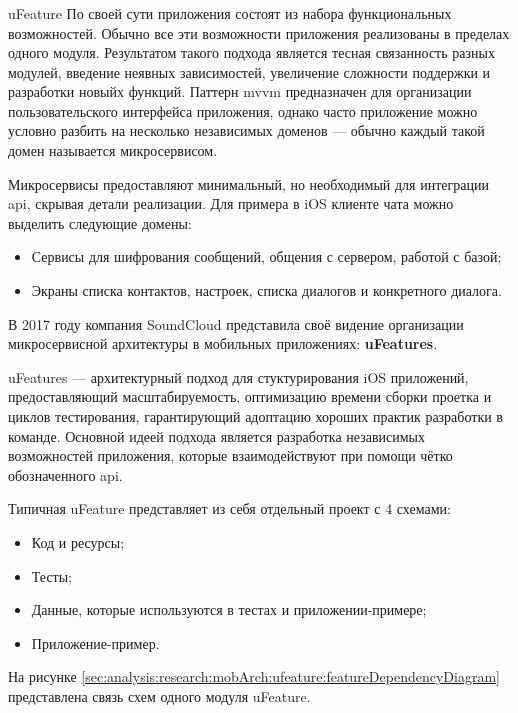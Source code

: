\subsubsection{} uFeature
По своей сути приложения состоят из набора функциональных возможностей. Обычно все эти возможности приложения реализованы в пределах одного модуля. Результатом такого подхода является тесная связанность разных модулей, введение неявных зависимостей, увеличение сложности поддержки и разработки новыйх функций. Паттерн \gls{mvvm} предназначен для организации пользовательского интерфейса приложения, однако часто приложение можно условно разбить на несколько независимых доменов --- обычно каждый такой домен называется микросервисом.

Микросервисы предоставляют минимальный, но необходимый для интеграции \gls{api}, скрывая детали реализации. Для примера в iOS клиенте чата можно выделить следующие домены:

\begin{itemize}
	\item Сервисы для шифрования сообщений, общения с сервером, работой с базой;
	\item Экраны списка контактов, настроек, списка диалогов и конкретного диалога.
\end{itemize}

В 2017 году компания SoundCloud представила своё видение организации микросервисной архитектуры в мобильных приложениях: \textbf{uFeatures}.

uFeatures --- архитектурный подход для стуктурирования iOS приложений, предоставляющий масштабируемость, оптимизацию времени сборки проетка и циклов тестирования, гарантирующий адоптацию хороших практик разработки в команде. Основной идеей подхода является разработка независимых возможностей приложения, которые взаимодействуют при помощи чётко обозначенного \gls{api}. \cite{soundcloud:ufeature}

Типичная uFeature представляет из себя отдельный проект с 4 схемами:

\begin{itemize}
	\item Код и ресурсы;
	\item Тесты;
	\item Данные, которые используются в тестах и приложении-примере;
	\item Приложение-пример.
\end{itemize}

На рисунке \ref{sec:analysis:research:mobArch:ufeature:featureDependencyDiagram} представлена связь схем одного модуля uFeature.

